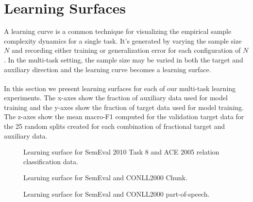 \section{Learning Surfaces}
A learning curve is a common technique for visualizing the empirical sample complexity dynamics for a single task. It's generated by varying the sample size $N$ and recording either training or generalization error for each configuration of $N$. In the multi-task setting, the sample size may be varied in both the target and auxiliary direction and the learning curve becomes a learning surface.
\\\\
In this section we present learning surfaces for each of our multi-task learning experiments. The x-axes show the fraction of auxiliary data used for model training and the y-axes show the fraction of target data used for model training. The z-axes show the mean macro-F1 computed for the validation target data for the 25 random splits created for each combination of fractional target and auxiliary data.

\newpage
\pagestyle{empty}
\vspace*{2cm}
\begin{figure}[h!]
	\hspace*{-2cm}
	\caption{Learning surface for SemEval 2010 Task 8 and ACE 2005 relation classification data.}
\end{figure}
\begin{figure}[h!]
	\hspace*{-2cm}
	\caption{Learning surface for SemEval and CONLL2000 Chunk.}
\end{figure}
\begin{figure}[h!]
	\hspace*{-2cm}
	\caption{Learning surface for SemEval and CONLL2000 part-of-speech.}
\end{figure}
\newpage
\pagestyle{plain}
